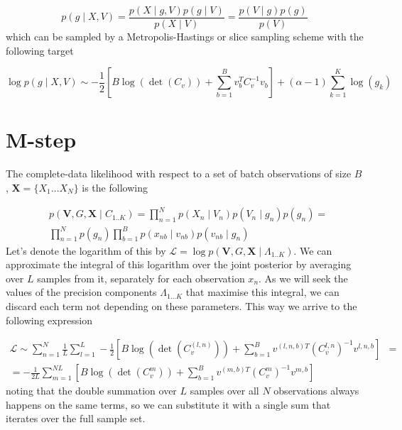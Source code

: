 \documentclass{paper}
\begin{document}
\begin{equation} 
p(g \mid X,V) = \frac{p(X \mid g,V) p(g \mid V)}{p(X \mid V)} = \frac{p(V \mid g) p(g)}{p(V)}
\end{equation}
%
which can be sampled by a Metropolis-Hastings or slice sampling scheme with the following target

\begin{equation} 
\log p(g \mid X,V) \sim -\frac{1}{2} \left[B\log(\det(C_v)) + \sum_{b=1}^B v_b^T C_v^{-1} v_b\right] + (\alpha-1) \sum_{k=1}^K \log(g_k)
\end{equation}

\section{M-step}

The complete-data likelihood with respect to a set of batch observations of size $B$, $\mathbf{X} = \lbrace X_1 \dots X_N \rbrace$ is the following

\begin{equation}
\begin{split}
&p(\mathbf{V},G,\mathbf{X} \mid C_{1..K}) = \prod_{n=1}^N p(X_n \mid V_n) p(V_n \mid g_n) p(g_n) = \\
&\prod_{n=1}^N p(g_n) \prod_{b=1}^B p(x_{nb} \mid v_{nb}) p(v_{nb} \mid g_n) 
\end{split}
\end{equation}
%
Let's denote the logarithm of this by $\mathcal{L}=\log p(\mathbf{V},G,\mathbf{X} \mid \Lambda_{1..K})$. We can approximate the integral of this logarithm over the joint posterior by averaging over $L$ samples from it, separately for each observation $x_n$. As we will seek the values of the precision components $\Lambda_{1 \dots K}$ that maximise this integral, we can discard each term not depending on these parameters. This way we arrive to the following expression 

\begin{equation}
\begin{split}
\mathcal{L} \sim \sum_{n=1}^N \frac{1}{L} \sum_{l=1}^L -\frac{1}{2} \left[B \log \left( \det \left( C_v^{(l,n)} \right) \right) + \sum_{b=1}^B v^{(l,n,b)T}  \left( C_v^{l,n} \right)^{-1} v^{l,n,b}\right]& = \\
= -\frac{1}{2L} \sum_{m=1}^{NL} \left[B \log \left( \det \left( C_v^{m} \right) \right) + \sum_{b=1}^B v^{(m,b)T}  \left( C_v^{m} \right)^{-1} v^{m,b}\right]&
\end{split}
\end{equation}
%
noting that the double summation over $L$ samples over all $N$ observations always happens on the same terms, so we can substitute it with a single sum that iterates over the full sample set.
\end{document}
